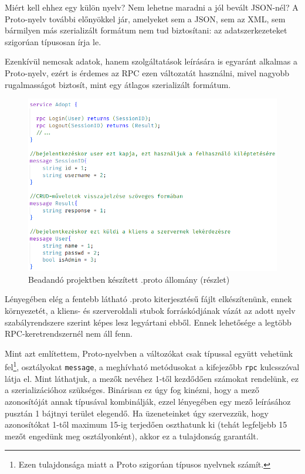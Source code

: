 \documentclass[tocnopagenum]{thesis-ekf}
\theoremstyle{definition}
\theoremstyle{remark}
\begin{document}
	Miért kell ehhez egy külön nyelv? Nem lehetne maradni a jól bevált JSON-nél? A Proto-nyelv további előnyökkel jár, amelyeket sem a JSON, sem az XML, sem bármilyen  más szerializált formátum nem tud biztosítani: az adatszerkezeteket szigorúan típusosan írja le.

	Ezenkívül nemcsak adatok, hanem szolgáltatások leírására is egyaránt alkalmas a Proto-nyelv, ezért is érdemes az RPC ezen változatát használni, mivel nagyobb rugalmasságot biztosít, mint egy átlagos szerializált formátum.
	\begin{figure}[h]
		\centering
		\includegraphics[scale=0.4]{protobuf}
		\caption{Beadandó projektben készített .proto állomány (részlet)}
		\label{fig:protobuf}
	\end{figure}

	Lényegében elég a fentebb látható .proto kiterjesztésű fájlt elkészítenünk, ennek környezetét, a kliens- és szerveroldali stubok forráskódjának vázát az adott nyelv szabályrendszere szerint képes lesz legyártani ebből. Ennek lehetősége a legtöbb RPC-keretrendszernél nem áll fenn.

	Mint azt említettem, Proto-nyelvben a változókat csak típussal együtt vehetünk fel\footnote{Ezen tulajdonsága miatt a Proto szigorúan típusos nyelvnek számít.}, osztályokat \verb*|message|, a meghívható metódusokat a kifejezőbb \verb*|rpc| kulcsszóval látja el. Mint láthatjuk, a mezők nevéhez 1-től kezdődően számokat rendelünk, ez a szerializációhoz szükséges. Binárisan ez úgy fog kinézni, hogy a mező azonosítóját annak típusával kombinálják, ezzel lényegében egy mező leírásához pusztán 1 bájtnyi terület elegendő. Ha üzeneteinket úgy szervezzük, hogy azonosítókat 1-től maximum 15-ig terjedően oszthatunk ki (tehát legfeljebb 15 mezőt engedünk meg osztályonként), akkor ez a tulajdonság garantált. 
	
\end{document}
